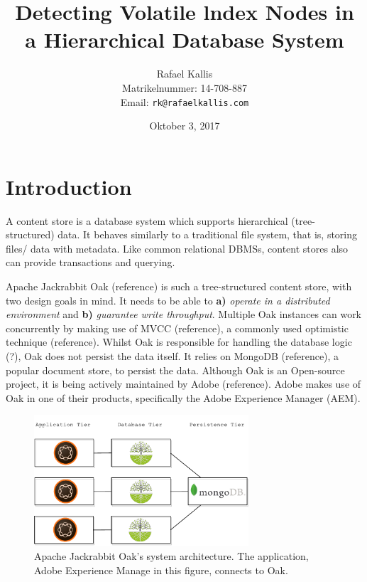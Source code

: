 \documentclass[abstracton,12pt]{scrreprt}
\title{Detecting Volatile lndex Nodes in a Hierarchical Database System}
\author{
  Rafael Kallis\\[-5pt]
  \scriptsize Matrikelnummer: 14-708-887\\[-5pt]
  \scriptsize Email: \texttt{rk@rafaelkallis.com}
}
\date{\vspace*{2cm}Oktober 3, 2017}
\begin{document}
\maketitle




\tableofcontents
\listoffigures
\listoftables

\chapter{Introduction}
 
A content store is a database system which supports hierarchical (tree-structured) data.
It behaves similarly to a traditional file system, that is, storing files/ data with metadata.
Like common relational DBMSs, content stores also can provide transactions and querying.

Apache Jackrabbit Oak (reference) is such a tree-structured content store, with two design goals in mind.
It needs to be able to \textbf{a)} \textit{operate in a distributed environment} and \textbf{b)} \textit{guarantee write throughput}.
Multiple Oak instances can work concurrently by making use of MVCC (reference), a commonly used optimistic technique (reference).
Whilst Oak is responsible for handling the database logic (?), Oak does not persist the data itself.
It relies on MongoDB (reference), a popular document store, to persist the data.
Although Oak is an Open-source project, it is being actively maintained by Adobe (reference).
Adobe makes use of Oak in one of their products, specifically the Adobe Experience Manager (AEM).

\begin{figure}[h]
    \label{fig:architecture}
    \centering
    \includegraphics[width=8cm]{architecture}
    \caption{Apache Jackrabbit Oak's system architecture. The application, Adobe Experience Manage in this figure, connects to Oak.}
\end{figure}
\end{document}
